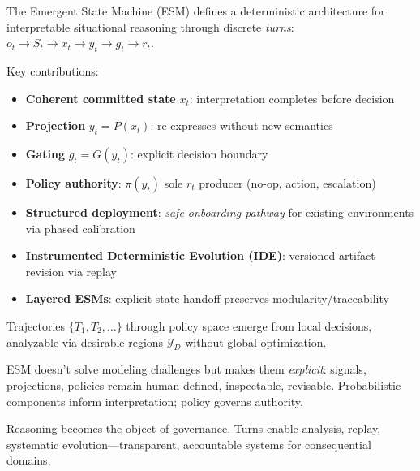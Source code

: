 \documentclass[11pt]{article}
\begin{document}
The Emergent State Machine (ESM) defines a deterministic architecture for interpretable situational reasoning through discrete \emph{turns}: $o_t \to S_t \to x_t \to y_t \to g_t \to r_t$.

Key contributions:
\begin{itemize}
\item \textbf{Coherent committed state} $x_t$: interpretation completes before decision
\item \textbf{Projection} $y_t = P(x_t)$: re-expresses without new semantics  
\item \textbf{Gating} $g_t = G(y_t)$: explicit decision boundary
\item \textbf{Policy authority}: $\pi(y_t)$ sole $r_t$ producer (no-op, action, escalation)
\item \textbf{Structured deployment}: \emph{safe onboarding pathway} for existing environments via phased calibration
\item \textbf{Instrumented Deterministic Evolution (IDE)}: versioned artifact revision via replay
\item \textbf{Layered ESMs}: explicit state handoff preserves modularity/traceability
\end{itemize}

Trajectories $\{T_1, T_2, \dots\}$ through policy space emerge from local decisions, analyzable via desirable regions $\mathcal{Y}_D$ without global optimization.

ESM doesn't solve modeling challenges but makes them \emph{explicit}: signals, projections, policies remain human-defined, inspectable, revisable. Probabilistic components inform interpretation; policy governs authority.

Reasoning becomes the object of governance. Turns enable analysis, replay, systematic evolution---transparent, accountable systems for consequential domains.



\end{document}
